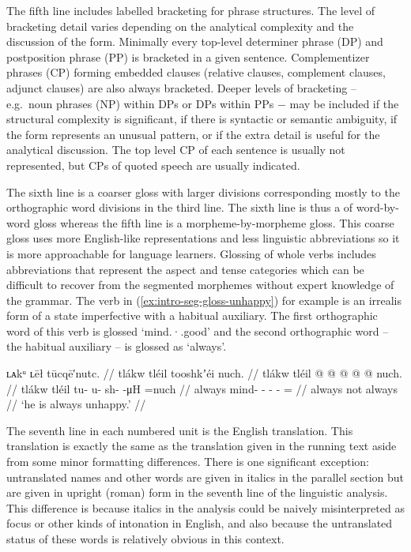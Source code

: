 The fifth line includes labelled bracketing for phrase structures.
The level of bracketing detail varies depending on the analytical complexity and the discussion of the form.
Minimally every top-level determiner phrase (DP) and postposition phrase (PP) is bracketed in a given sentence.
Complementizer phrases (CP) forming embedded clauses (relative clauses, complement clauses, adjunct clauses) are also always bracketed.
Deeper levels of bracketing – e.g.\ noun phrases (NP) within DPs or DPs within PPs − may be included if the structural complexity is significant, if there is syntactic or semantic ambiguity, if the form represents an unusual pattern, or if the extra detail is useful for the analytical discussion.
The top level CP of each sentence is usually not represented, but CPs of quoted speech are usually indicated.

The sixth line is a coarser gloss with larger divisions corresponding mostly to the orthographic word divisions in the third line.
The sixth line is thus a of word-by-word gloss whereas the fifth line is a morpheme-by-morpheme gloss.
This coarse gloss uses more English-like representations and less linguistic abbreviations so it is more approachable for language learners.
Glossing of whole verbs includes abbreviations that represent the aspect and tense categories which can be difficult to recover from the segmented morphemes without expert knowledge of the grammar.
The verb in (\ref{ex:intro-seg-gloss-unhappy}) for example is an irrealis form of a state imperfective with a habitual auxiliary.
The first orthographic word of this verb is glossed ‘mind.·.good’ and the second orthographic word – the habitual auxiliary – is glossed as ‘always’.

\ex\label{ex:intro-seg-gloss-unhappy}%
%
\begingl
	\glpreamble	ʟᴀkᵘ ʟēł tūcqē′nutc. //
	\glpreamble	tlákw tléil tooshkʼéi nuch. //
	\gla	tlákw tléil  @ {} @ {} @ {} @ {} @ \•nuch. //
	\glb	tlákw tléil tu- u- sh-  -μH =nuch //
	\glc	always  mind- - -  - = //
	\gld	always not  {} {} {} {} \•always //
	\glft	‘he is always unhappy.’
		//
\endgl
\xe

The seventh line in each numbered unit is the English translation.
This translation is exactly the same as the translation given in the running text aside from some minor formatting differences.
There is one significant exception: untranslated names and other words are given in italics in the parallel section but are given in upright (roman) form in the seventh line of the linguistic analysis.
This difference is because italics in the analysis could be naively misinterpreted as focus or other kinds of intonation in English, and also because the untranslated status of these words is relatively obvious in this context.

